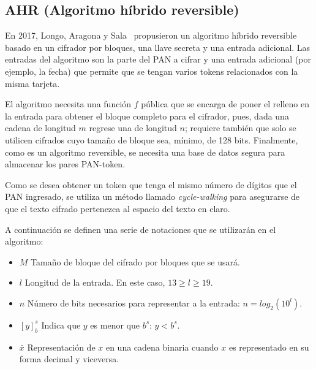%
%

\subsection{AHR (Algoritmo híbrido reversible)}
En 2017, Longo, Aragona y Sala~\cite{aragona} propusieron un algoritmo híbrido
reversible basado en un cifrador por bloques, una llave secreta y una entrada
adicional. Las entradas del algoritmo son la parte del PAN a cifrar y una
entrada adicional (por ejemplo, la fecha) que permite que se tengan varios
tokens relacionados con la misma tarjeta.

El algoritmo necesita una función $ f $ pública que se encarga de poner el
relleno en la entrada para obtener el bloque completo para el cifrador, pues,
dada una cadena de longitud $ m $ regrese una de longitud $ n $; requiere
también que solo se utilicen cifrados cuyo tamaño de bloque sea, mínimo, de 128
bits. Finalmente, como es un algoritmo reversible, se necesita una base de datos
segura para almacenar los pares PAN-token.

Como se desea obtener un token que tenga el mismo número de dígitos que el PAN
ingresado, se utiliza un método llamado \textit{cycle-walking} para asegurarse
de que el texto cifrado pertenezca al espacio del texto en claro.

A continuación se definen una serie de notaciones que se utilizarán en el
algoritmo:
\begin{itemize}
  \item $ M $ Tamaño de bloque del cifrado por bloques que se usará.
  \item $ l $ Longitud de la entrada. En este caso, $13 \geq l \geq 19$.
  \item $ n $ Número de bits necesarios para representar a la entrada:
    $n = log_2(10^l)$.
  \item $ [y]^s_b $ Indica que $y$ es menor que $b^s$: $y < b^s$.
  \item $\bar{x}$ Representación de $x$ en una cadena binaria cuando $x$ es
    representado en su forma decimal y viceversa.
\end{itemize}

